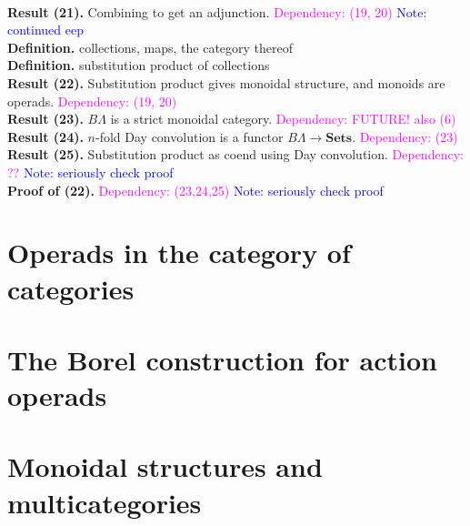 \documentclass{amsart}
\begin{document}
\\ \textbf{Result (21).} Combining to get an adjunction. \textcolor{magenta}{Dependency: (19, 20)} \textcolor{blue}{Note: continued eep}
\\ \textbf{Definition.} collections, maps, the category thereof
\\ \textbf{Definition.} substitution product of collections
\\ \textbf{Result (22).} Substitution product gives monoidal structure, and monoids are operads. \textcolor{magenta}{Dependency: (19, 20)}
\\ \textbf{Result (23).} $B\Lambda$ is a strict monoidal category. \textcolor{magenta}{Dependency: FUTURE! also (6)}
\\ \textbf{Result (24).} $n$-fold Day convolution is a functor $B\Lambda \to \mathbf{Sets}$. \textcolor{magenta}{Dependency: (23)}
\\ \textbf{Result (25).} Substitution product as coend using Day convolution. \textcolor{magenta}{Dependency: ??} \textcolor{blue}{Note: seriously check proof}
\\ \textbf{Proof of (22).} \textcolor{magenta}{Dependency: (23,24,25)} \textcolor{blue}{Note: seriously check proof}


\section{Operads in the category of categories}



\section{The Borel construction for action operads}

\section{Monoidal structures and multicategories}
\end{document}

